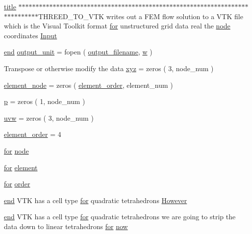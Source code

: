 \begin{DoxyCompactItemize}
\item 
\hyperlink{a00617_a051e403214cb6872ad3fe4e50302a6ee}{title} $\ast$$\ast$$\ast$$\ast$$\ast$$\ast$$\ast$$\ast$$\ast$$\ast$$\ast$$\ast$$\ast$$\ast$$\ast$$\ast$$\ast$$\ast$$\ast$$\ast$$\ast$$\ast$$\ast$$\ast$$\ast$$\ast$$\ast$$\ast$$\ast$$\ast$$\ast$$\ast$$\ast$$\ast$$\ast$$\ast$$\ast$$\ast$$\ast$$\ast$$\ast$$\ast$$\ast$$\ast$$\ast$$\ast$$\ast$$\ast$$\ast$$\ast$$\ast$$\ast$$\ast$$\ast$$\ast$$\ast$$\ast$$\ast$$\ast$$\ast$$\ast$$\ast$$\ast$$\ast$$\ast$$\ast$$\ast$$\ast$$\ast$$\ast$$\ast$$\ast$$\ast$$\ast$$\ast$$\ast$$\ast$T\+H\+R\+E\+E\+D\+\_\+\+T\+O\+\_\+\+V\+TK writes out a F\+EM flow solution to a V\+TK file which is the Visual Toolkit format \hyperlink{a00623_ad1e7380d51df1e0043d24d3c8a860e0a}{for} unstructured grid data real the \hyperlink{a00611_adf51fe9945b6ca147057cc27ff639d0f}{node} coordinates \hyperlink{a00611_a907ed5ee8283aeb52e59d544b4aa69fa}{Input}
\item 
\hyperlink{a00608_afb358f48b1646c750fb9da6c6585be2b}{end} \hyperlink{a00611_a21b113ecd24e6ae8a92fa4a149ad8701}{output\+\_\+unit} = fopen ( \hyperlink{a00617_a5934d690c688edbd92210f38fe5855e7}{output\+\_\+filename}, \textquotesingle{}\hyperlink{a00605_aad57484016654da87125db86f4227ea3}{w}\textquotesingle{} )
\item 
Transpose or otherwise modify the data \hyperlink{a00611_a534015daa58c291db01fdaa6ea94b267}{xyz} = zeros ( 3, node\+\_\+num )
\item 
\hyperlink{a00611_a6e1aca963bebde79824bef83587803b7}{element\+\_\+node} = zeros ( \hyperlink{a00611_aa77ee84ffb15118601acbd018f243edc}{element\+\_\+order}, element\+\_\+num )
\item 
\hyperlink{a00611_ac483f6ce851c9ecd9fb835ff7551737c}{p} = zeros ( 1, node\+\_\+num )
\item 
\hyperlink{a00611_ab72eb62a9262d5c8dbb6ce78753722f7}{uvw} = zeros ( 3, node\+\_\+num )
\item 
\hyperlink{a00611_aa77ee84ffb15118601acbd018f243edc}{element\+\_\+order} = 4
\item 
\hyperlink{a00623_ad1e7380d51df1e0043d24d3c8a860e0a}{for} \hyperlink{a00611_adf51fe9945b6ca147057cc27ff639d0f}{node}
\item 
\hyperlink{a00623_ad1e7380d51df1e0043d24d3c8a860e0a}{for} \hyperlink{a00611_a4998e7f4989562d1ed06579e07265c30}{element}
\item 
\hyperlink{a00623_ad1e7380d51df1e0043d24d3c8a860e0a}{for} \hyperlink{a00611_aab21ede0c02820806e77fd7890ee6bd7}{order}
\item 
\hyperlink{a00608_afb358f48b1646c750fb9da6c6585be2b}{end} V\+TK has a cell type \hyperlink{a00623_ad1e7380d51df1e0043d24d3c8a860e0a}{for} quadratic tetrahedrons \hyperlink{a00611_a06aa2a2311093ba3e5410b837d992a36}{However}
\item 
\hyperlink{a00608_afb358f48b1646c750fb9da6c6585be2b}{end} V\+TK has a cell type \hyperlink{a00623_ad1e7380d51df1e0043d24d3c8a860e0a}{for} quadratic tetrahedrons we are going to strip the data down to linear tetrahedrons \hyperlink{a00623_ad1e7380d51df1e0043d24d3c8a860e0a}{for} \hyperlink{a00611_aa29f73e143f483fb55111e009a9e426f}{now}
\end{DoxyCompactItemize}


